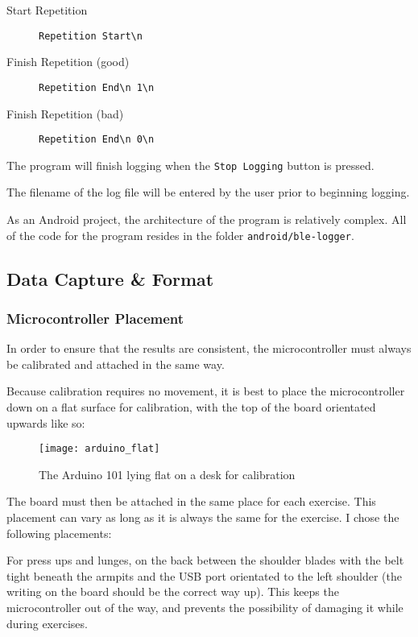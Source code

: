 \documentclass[a4paper]{article}
\begin{document}
\begin{description}
\item[Start Repetition] \lstinline|Repetition Start\n|
\item[Finish Repetition (good)] \lstinline|Repetition End\n 1\n|
\item[Finish Repetition (bad)] \lstinline|Repetition End\n 0\n|
\end{description}

The program will finish logging when the \lstinline{Stop Logging} button is pressed.

The filename of the log file will be entered by the user prior to beginning logging.

As an Android project, the architecture of the program is relatively complex. All of the code for the program resides in the folder \lstinline{android/ble-logger}. 


\subsection{Data Capture \& Format}%
\label{subsec:dc_datacapture}

\subsubsection{Microcontroller Placement}
\label{subsubsec:dc_dc_placement}

In order to ensure that the results are consistent, the microcontroller must always be calibrated and attached in the same way.

Because calibration requires no movement, it is best to place the microcontroller down on a flat surface for calibration, with the top of the board orientated upwards like so:

\begin{figure}[H]
    \centering
        \texttt{[image: arduino\_flat]}
        \caption{The Arduino 101 lying flat on a desk for calibration}
        \label{fig:ar_flat}
\end{figure}

The board must then be attached in the same place for each exercise. This placement can vary as long as it is always the same for the exercise. I chose the following placements:

For press ups and lunges, on the back between the shoulder blades with the belt tight beneath the armpits and the USB port orientated to the left shoulder (the writing on the board should be the correct way up). This keeps the microcontroller out of the way, and prevents the possibility of damaging it while during exercises.
\end{document}
